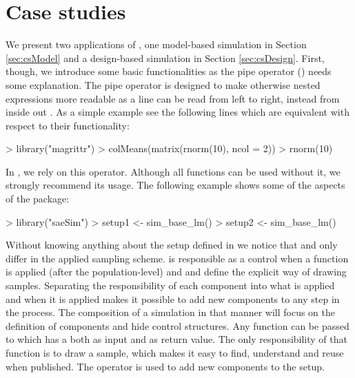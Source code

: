 \documentclass[article]{ajs}
\begin{document}
\section{Case studies}
\label{sec:caseStudy}
We present two applications of , one model-based simulation in Section \ref{sec:csModel} and a design-based simulation in Section \ref{sec:csDesign}. First, though, we introduce some basic functionalities as the pipe operator (\proglang{\%>\%}) needs some explanation. The pipe operator is designed to make otherwise nested expressions more readable as a line can be read from left to right, instead from inside out \citep{bache14}. As a simple example see the following lines which are equivalent with respect to their functionality:

\begin{Schunk}
\begin{Sinput}
> library("magrittr")
> colMeans(matrix(rnorm(10), ncol = 2))
> rnorm(10) %
\end{Sinput}
\end{Schunk}

In , we rely on this operator. Although all functions can be used without it, we strongly recommend its usage. The following example shows some of the aspects of the package:


\begin{Schunk}
\begin{Sinput}
> library("saeSim")
> setup1 <- sim_base_lm() %
> setup2 <- sim_base_lm() %
\end{Sinput}
\end{Schunk}

Without knowing anything about the setup defined in  we notice that  and  only differ in the applied sampling scheme.  is responsible as a control when a function is applied (after the population-level) and  and  define the explicit way of drawing samples. Separating the responsibility of each component into what is applied and when it is applied makes it possible to add new components to any step in the process. The composition of a simulation in that manner will focus on the definition of components and hide control structures. Any function can be passed to  which has a  both as input and as return value. The only responsibility of that function is to draw a sample, which makes it easy to find, understand and reuse when published. The operator \proglang{\%>\%} is used to add new components to the setup. 
\end{document}
